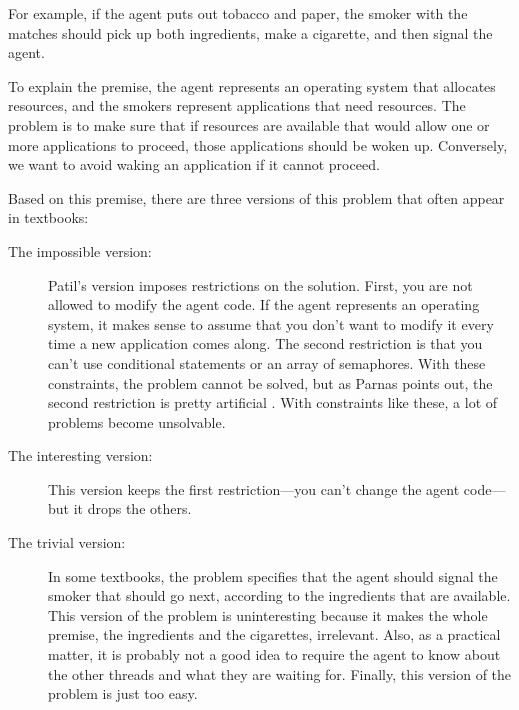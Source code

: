 \documentclass{book}
\begin{document}
For example, if the agent puts out tobacco and paper, the
smoker with the matches should pick up both ingredients, make
a cigarette, and then signal the agent.

To explain the premise, the agent represents an operating system that
allocates resources, and the smokers represent applications that need
resources.  The problem is to make sure that if resources are
available that would allow one or more applications to proceed,
those applications should be woken up.  Conversely, we want to avoid
waking an application if it cannot proceed.



Based on this premise, there are three versions of this problem
that often appear in textbooks:

\begin{description}

    \item[The impossible version:] Patil's version imposes restrictions on
          the solution.  First, you are not allowed to modify the agent code.
          If the agent represents an operating system, it makes sense to assume
          that you don't want to modify it every time a new application comes
          along.  The second restriction is that you can't use conditional
          statements or an array of semaphores.  With these constraints, the
          problem cannot be solved, but as Parnas points out, the second
          restriction is pretty artificial \cite{Parnas}.  With constraints like
          these, a lot of problems become unsolvable.

    \item[The interesting version:] This version keeps the first
          restriction---you can't change the agent code---but it drops the others.

    \item[The trivial version:] In some textbooks, the problem specifies
          that the agent should signal the smoker that should go next, according
          to the ingredients that are available.  This version of the problem
          is uninteresting because it makes the whole premise, the ingredients
          and the cigarettes, irrelevant.  Also, as a practical matter, it is
          probably not a good idea to require the agent to know about the other
          threads and what they are waiting for.  Finally, this version of
          the problem is just too easy.

\end{description}
\end{document}
